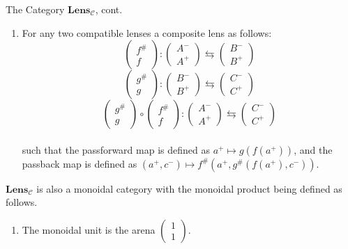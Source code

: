 \documentclass[12pt]{article}
\begin{document}
\begin{definition*}{The Category $\textbf{Lens}_\mathcal{C}$, cont.}{}
  \begin{enumerate}\addtocounter{enumi}{3}
    \item For any two compatible lenses a composite lens as follows:
          $$\begin{pmatrix}f^{\#}\\f\end{pmatrix}:\begin{pmatrix}A^-\\A^+\end{pmatrix}\leftrightarrows\begin{pmatrix}B^-\\B^+\end{pmatrix}$$
          $$\begin{pmatrix}g^{\#}\\g\end{pmatrix}:\begin{pmatrix}B^-\\B^+\end{pmatrix}\leftrightarrows\begin{pmatrix}C^-\\C^+\end{pmatrix}$$
          $$\begin{pmatrix}g^{\#}\\g\end{pmatrix} \circ \begin{pmatrix}f^{\#}\\f\end{pmatrix}:\begin{pmatrix}A^-\\A^+\end{pmatrix}\leftrightarrows\begin{pmatrix}C^-\\C^+\end{pmatrix}$$
          \\such that the passforward map is defined as $a^+ \mapsto g(f(a^+))$,
          and the passback map is defined as $(a^+, c^-) \mapsto f^\#(a^+, g^\#(f(a^+), c^-))$.
  \end{enumerate}
  $\textbf{Lens}_{\mathcal{C}}$ is also a monoidal category with the monoidal product being defined as follows.
  \begin{enumerate}
    \item The monoidal unit is the arena $\begin{pmatrix}1\\1\end{pmatrix}$.

\end{enumerate}
\end{definition*}
\end{document}
